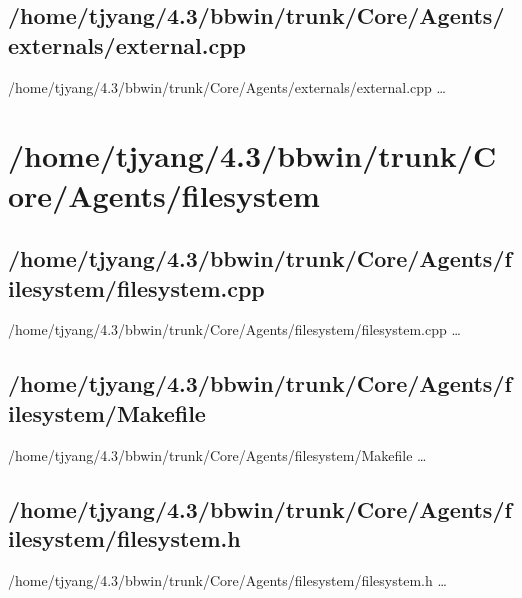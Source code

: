 \subsection{/home/tjyang/4.3/bbwin/trunk/Core/Agents/externals/external.cpp}
\lstset{numberstyle=\tiny,numbers=left,
   breaklines=true,
   stepnumber=1,numbersep=5pt,firstnumber=1,
   xleftmargin=12pt,showstringspaces=false}
\noindent /home/tjyang/4.3/bbwin/trunk/Core/Agents/externals/external.cpp  \ldots



\section{/home/tjyang/4.3/bbwin/trunk/Core/Agents/filesystem}

\subsection{/home/tjyang/4.3/bbwin/trunk/Core/Agents/filesystem/filesystem.cpp}
\lstset{numberstyle=\tiny,numbers=left,
   breaklines=true,
   stepnumber=1,numbersep=5pt,firstnumber=1,
   xleftmargin=12pt,showstringspaces=false}
\noindent /home/tjyang/4.3/bbwin/trunk/Core/Agents/filesystem/filesystem.cpp  \ldots



\subsection{/home/tjyang/4.3/bbwin/trunk/Core/Agents/filesystem/Makefile}
\lstset{numberstyle=\tiny,numbers=left,
   breaklines=true,
   stepnumber=1,numbersep=5pt,firstnumber=1,
   xleftmargin=12pt,showstringspaces=false}
\noindent /home/tjyang/4.3/bbwin/trunk/Core/Agents/filesystem/Makefile  \ldots



\subsection{/home/tjyang/4.3/bbwin/trunk/Core/Agents/filesystem/filesystem.h}
\lstset{numberstyle=\tiny,numbers=left,
   breaklines=true,
   stepnumber=1,numbersep=5pt,firstnumber=1,
   xleftmargin=12pt,showstringspaces=false}
\noindent /home/tjyang/4.3/bbwin/trunk/Core/Agents/filesystem/filesystem.h  \ldots







